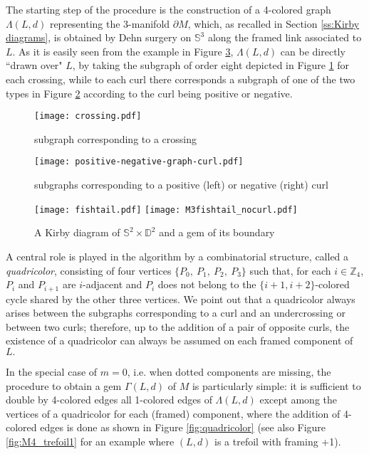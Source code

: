 \documentclass[12pt,a4paper]{article}
\newcommand{\G}{\Gamma}
\begin{document}
The starting step of the procedure is the construction of a 4-colored graph $\Lambda(L,d)$ representing the 3-manifold $\partial M$, which, as recalled in Section \ref{ss:Kirby diagrams}, is obtained by Dehn surgery on $\mathbb S^3$ along the framed link associated to $L.$ As it is easily seen from the example in Figure \ref{fig:fishtail_3dim}, $\Lambda(L,d)$ can be directly ``drawn over" $L$, by taking the subgraph of order eight depicted in Figure \ref{fig:crossing} for each crossing, while to each curl there corresponds a subgraph of one of the two types in Figure \ref{fig:positive-negative-graph-curl} according to the curl being positive or negative.


\begin{figure} [h!]
    \centering
    \texttt{[image: crossing.pdf]}
\caption{subgraph corresponding to a crossing}
    \label{fig:crossing}
\end{figure}

\begin{figure} [h!]
    \centering
    \texttt{[image: positive-negative-graph-curl.pdf]}
\caption{subgraphs corresponding to a positive (left) or negative (right) curl}
    \label{fig:positive-negative-graph-curl}
\end{figure}

\begin{figure} [h!]
    \centering
    \texttt{[image: fishtail.pdf]}\quad
    \texttt{[image: M3fishtail\_nocurl.pdf]}
\caption{A Kirby diagram of $\mathbb S^2\times\mathbb D^2$ and a gem of its boundary}
    \label{fig:fishtail_3dim}
\end{figure}


A central role is played in the algorithm by a combinatorial structure, called a {\it quadricolor}, consisting of four vertices $\{P_0,\ P_1,\ P_2,\ P_3\}$ such that, for each $i\in\mathbb Z_4$, $P_{i}$ and $P_{i+1}$ are $i$-adjacent and $P_{i}$ does not belong to the $\{i+1,i+2\}$-colored cycle shared by the other three vertices. We point out that a quadricolor always arises between the subgraphs corresponding to a curl and an undercrossing or between two curls; therefore, up to the addition of a pair of opposite curls, the existence of a quadricolor can always be assumed on each framed component of $L.$

In the special case of $m=0$, i.e. when dotted components are missing, the procedure to obtain a gem $\G(L,d)$ of $M$ is particularly simple: it is sufficient to double by 4-colored edges all 1-colored edges of $\Lambda(L,d)$ except among the vertices of a quadricolor for each (framed) component, where the addition of 4-colored edges is done as shown in Figure \ref{fig:quadricolor} (see also Figure \ref{fig:M4_trefoil1} for an example where $(L,d)$ is a trefoil with framing +1).
\end{document}
